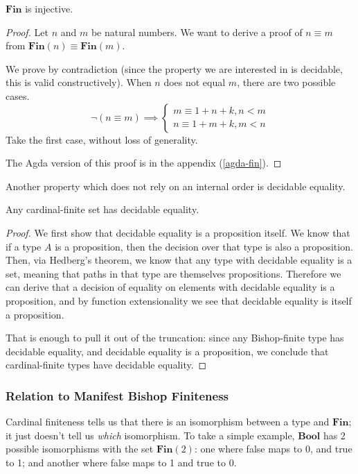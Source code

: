 \begin{lemma} \label{fin-inj}
  \(\textbf{Fin}\) is injective.
\end{lemma}
\begin{proof}
  Let \(n\) and \(m\) be natural numbers.
  We want to derive a proof of \(n \equiv m\) from \(\textbf{Fin}(n) \equiv
  \textbf{Fin}(m)\).

  We prove by contradiction (since the property we are interested in is
  decidable, this is valid constructively).
  When \(n\) does not equal \(m\), there are two possible cases.
  \begin{equation}
    \neg (n \equiv m) \implies
    \begin{cases}
      m \equiv 1 + n + k, n < m  \\
      n \equiv 1 + m + k, m < n
    \end{cases}
  \end{equation}
  Take the first case, without loss of generality.

  The Agda version of this proof is in the appendix (\ref{agda-fin}).
\end{proof}

Another property which does not rely on an internal order is decidable equality.
\begin{theorem} \label{cardinal-finite-discrete}
  Any cardinal-finite set has decidable equality.
\end{theorem}
\begin{proof}
  We first show that decidable equality is a proposition itself.
  We know that if a type \(A\) is a proposition, then the decision over that
  type is also a proposition.
  Then, via Hedberg's theorem, we know that any type with decidable equality is
  a set, meaning that paths in that type are themselves propositions.
  Therefore we can derive that a decision of equality on elements with decidable
  equality is a proposition, and by function extensionality we see that
  decidable equality is itself a proposition.

  That is enough to pull it out of the truncation: since any Bishop-finite type
  has decidable equality, and decidable equality is a proposition, we conclude
  that cardinal-finite types have decidable equality.
\end{proof}
\subsubsection{Relation to Manifest Bishop Finiteness}
Cardinal finiteness tells us that there is an isomorphism between a type and
\(\mathbf{Fin}\); it just doesn't tell us \emph{which} isomorphism.
To take a simple example, \(\mathbf{Bool}\) has 2 possible isomorphisms with the
set \(\mathbf{Fin}(2)\): one where false maps to 0, and true to 1; and another
where false maps to 1 and true to 0.

